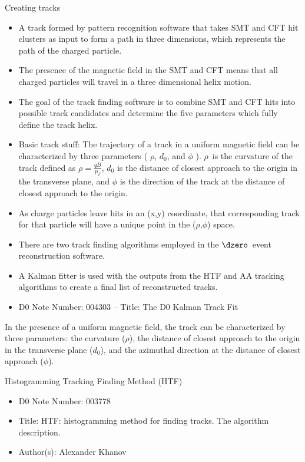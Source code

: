 Creating tracks
\begin{itemize}
\item A track formed by pattern recognition software that takes SMT and CFT hit clusters as input to form a path in three dimensions, which represents the path of the charged particle.
\item The presence of the magnetic field in the SMT and CFT means that all charged particles will travel in a three dimensional helix motion.
\item The goal of the track finding software is to combine SMT and CFT hits into possible track candidates and determine the five parameters which fully define the track helix.
\item Basic track stuff: The trajectory of a track in a uniform magnetic field can be characterized by three parameters ( $\rho$, $d_{0}$, and $\phi$ ). $\rho$~is the curvature of the track defined as $\rho = \frac{qB}{p_{T}}$, $d_{0}$ is the distance of closest approach to the origin in the transverse plane, and $\phi$ is the direction of the track at the distance of closest approach to the origin.
\item As charge particles leave hits in an (x,y) coordinate, that corresponding track for that particle will have a unique point in the ($\rho$,$\phi$) space.
\item There are two track finding algorithms employed in the $\dzero$~event reconstruction software.
\item A Kalman fitter is used with the outputs from the HTF and AA tracking algorithms to create a final list of reconstructed tracks.
\item D0 Note Number: 004303 -- Title: The D0 Kalman Track Fit
\end{itemize}

In the presence of a uniform magnetic field, the track can be characterized by three parameters: the curvature ($\rho$), the distance of closest approach to the origin in the transverse plane ($d_{0}$), and the azimuthal direction at the distance of closest approach ($\phi$).

Histogramming Tracking Finding Method (HTF)
\begin{itemize}
\item D0 Note Number: 003778
\item Title: HTF: histogramming method for finding tracks. The algorithm description.
\item Author(s): Alexander Khanov
\end{itemize}

